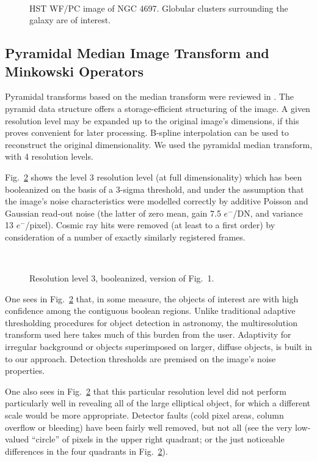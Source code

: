 \begin{figure}[t]
\centerline{
\hbox{
}}
\caption{HST WF/PC image of NGC 4697.  Globular clusters surrounding the galaxy are of interest.}
\label{ch10orig}
\end{figure}


\subsection{Pyramidal Median Image Transform and Minkowski Operators}

Pyramidal transforms based on the median transform were reviewed in 
\cite{starck95}.  The pyramid data structure offers a storage-efficient
structuring of the image.  A given resolution level may be expanded up to 
the original image's dimensions, if this proves convenient for later 
processing.  B-spline interpolation can be used to reconstruct the original
dimensionality.  We used the pyramidal median transform, with 4 resolution 
levels.

Fig.\ \ref{ch10seg3} shows the level 3 resolution level (at full 
dimensionality) which has been booleanized on the basis of a 3-sigma 
threshold, and under the assumption that the image's noise characteristics
were modelled correctly by additive Poisson and Gaussian read-out noise
(the latter of zero mean, gain 7.5 $e^-$/DN, and variance 13 $e^-$/pixel).  
Cosmic ray hits were removed (at least to a first order) by consideration of
a number of exactly similarly registered frames.

\begin{figure}[h]
\centerline{
\hbox{
}}
\caption{Resolution level 3, booleanized, version of Fig.\ 1.}
\label{ch10seg3}
\end{figure}


One sees in Fig.\ \ref{ch10seg3} that, in some measure, the objects of 
interest are with high confidence among the contiguous boolean regions. 
Unlike traditional adaptive thresholding procedures for object detection 
in astronomy, the multiresolution transform used here takes much of this
burden from the user.  Adaptivity for irregular background or objects 
superimposed on larger, diffuse objects, is built in to our approach.  
Detection thresholds are premised on the image's noise properties.

One also sees in Fig.\ \ref{ch10seg3} 
that this particular resolution level did not perform
particularly well in revealing all of the large elliptical object, for which a
different scale would be more appropriate.  
Detector faults (cold pixel areas, column overflow or bleeding) have been 
fairly well removed, but not all (see the very low-valued ``circle'' of pixels
in the upper right quadrant; or the just noticeable differences in the four
quadrants in Fig.\ \ref{ch10seg3}).  

